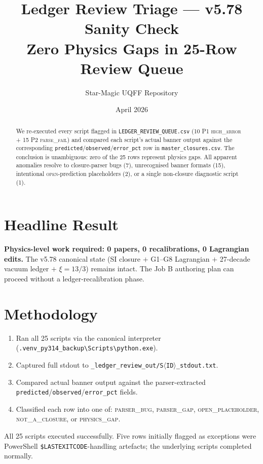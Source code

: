 \documentclass[11pt]{article}
\title{Ledger Review Triage --- v5.78 Sanity Check\\
       \large Zero Physics Gaps in 25-Row Review Queue}
\author{Star-Magic UQFF Repository}
\date{April 2026}
\begin{document}
\maketitle

\begin{abstract}
We re-executed every script flagged in \texttt{LEDGER\_REVIEW\_QUEUE.csv} (10 P1 \textsc{high\_error} + 15 P2 \textsc{parse\_fail}) and compared each script's actual banner output against the corresponding \texttt{predicted}/\texttt{observed}/\texttt{error\_pct} row in \texttt{master\_closures.csv}. The conclusion is unambiguous: zero of the 25 rows represent physics gaps. All apparent anomalies resolve to closure-parser bugs (7), unrecognised banner formats (15), intentional \textsc{open}-prediction placeholders (2), or a single non-closure diagnostic script (1).
\end{abstract}

\section{Headline Result}
\textbf{Physics-level work required: 0 papers, 0 recalibrations, 0 Lagrangian edits.} The v5.78 canonical state (SI closure $+$ G1--G8 Lagrangian $+$ 27-decade vacuum ledger $+$ $\xi = 13/3$) remains intact. The Job B authoring plan can proceed without a ledger-recalibration phase.

\section{Methodology}
\begin{enumerate}
  \item Ran all 25 scripts via the canonical interpreter (\texttt{.venv\_py314\_backup\textbackslash Scripts\textbackslash python.exe}).
  \item Captured full stdout to \texttt{\_ledger\_review\_out/S$\langle$ID$\rangle$\_stdout.txt}.
  \item Compared actual banner output against the parser-extracted \texttt{predicted}/\texttt{observed}/\texttt{error\_pct} fields.
  \item Classified each row into one of: \textsc{parser\_bug}, \textsc{parser\_gap}, \textsc{open\_placeholder}, \textsc{not\_a\_closure}, or \textsc{physics\_gap}.
\end{enumerate}
All 25 scripts executed successfully. Five rows initially flagged as exceptions were PowerShell \texttt{\$LASTEXITCODE}-handling artefacts; the underlying scripts completed normally.
\end{document}
